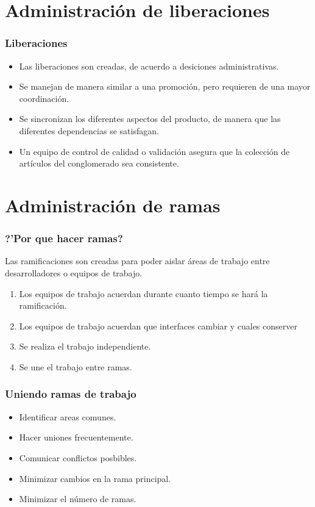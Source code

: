 \section{Administraci\'on de liberaciones}
\begin{frame}
	\frametitle{Liberaciones}
	\begin{itemize}
		\item Las liberaciones son creadas, de acuerdo a desiciones administrativas. 
		\item Se manejan de manera similar a una promoci\'on, pero requieren de una mayor coordinaci\'on. 
		\item Se sincronizan los diferentes aspectos del producto, de manera que las diferentes dependencias se satisfagan.
		\item Un equipo de control de calidad o validaci\'on asegura que la colecci\'on de art\'iculos del conglomerado sea consistente. 
	\end{itemize}
\end{frame}

\section{Administraci\'on de ramas}
\begin{frame}
	\frametitle{?'Por que hacer ramas?}
	Las ramificaciones son creadas para poder aislar \'areas de trabajo entre desarrolladores o equipos de trabajo. 
	\begin{enumerate}
		\item Los equipos de trabajo acuerdan durante cuanto tiempo se har\'a la ramificaci\'on. 
		\item Los equipos de trabajo acuerdan que interfaces cambiar y cuales conserver
		\item Se realiza el trabajo independiente. 
		\item Se une el trabajo entre ramas. 
	\end{enumerate}
	
\end{frame}
\begin{frame}
	\frametitle{Uniendo ramas de trabajo}
	\begin{itemize}
		\item Identificar areas comunes.
		\item Hacer uniones frecuentemente. 
		\item Comunicar conflictos posbibles. 
		\item Minimizar cambios en la rama principal. 
		\item Minimizar el n\'umero de ramas. 
	\end{itemize}
\end{frame}

